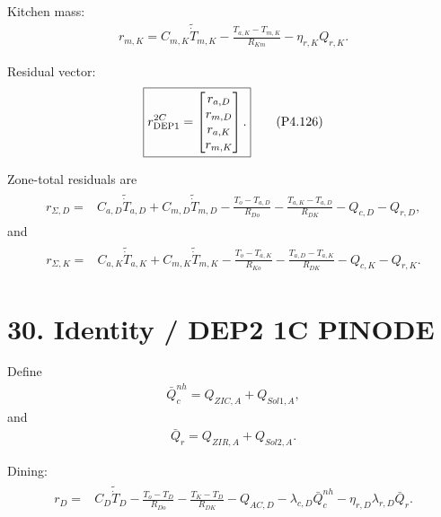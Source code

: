 \documentclass[11pt]{article}
\begin{document}
Kitchen mass:
\begin{align}
\boxed{
r_{m,K}
=
C_{m,K}\widetilde{\dot T}_{m,K}
-
\frac{T_{a,K}-T_{m,K}}{R_{Km}}
-
\eta_{r,K}Q_{r,K}.
}
\tag{P4.125}
\end{align}

Residual vector:
\begin{align}
\boxed{
r_{\rm DEP1}^{2C}
=
\begin{bmatrix}
r_{a,D}\\r_{m,D}\\r_{a,K}\\r_{m,K}
\end{bmatrix}.
}
\tag{P4.126}
\end{align}

Zone-total residuals are
\begin{align}
\boxed{
\begin{aligned}
r_{\Sigma,D}
={}&
C_{a,D}\widetilde{\dot T}_{a,D}
+
C_{m,D}\widetilde{\dot T}_{m,D}
-
\frac{T_o-T_{a,D}}{R_{Do}}
-
\frac{T_{a,K}-T_{a,D}}{R_{DK}}
-
Q_{c,D}
-
Q_{r,D},
\end{aligned}
}
\tag{P4.127}
\end{align}
and
\begin{align}
\boxed{
\begin{aligned}
r_{\Sigma,K}
={}&
C_{a,K}\widetilde{\dot T}_{a,K}
+
C_{m,K}\widetilde{\dot T}_{m,K}
-
\frac{T_o-T_{a,K}}{R_{Ko}}
-
\frac{T_{a,D}-T_{a,K}}{R_{DK}}
-
Q_{c,K}
-
Q_{r,K}.
\end{aligned}
}
\tag{P4.128}
\end{align}

\section*{30. Identity / DEP2 1C PINODE}

Define
\begin{align}
\boxed{
\bar Q_c^{nh}
=
Q_{ZIC,A}+Q_{Sol1,A},
}
\tag{P4.129}
\end{align}
and
\begin{align}
\boxed{
\bar Q_r
=
Q_{ZIR,A}+Q_{Sol2,A}.
}
\tag{P4.130}
\end{align}

Dining:
\begin{align}
\boxed{
\begin{aligned}
r_D
={}&
C_D\widetilde{\dot T}_D
-
\frac{T_o-T_D}{R_{Do}}
-
\frac{T_K-T_D}{R_{DK}}
-
Q_{AC,D}
-
\lambda_{c,D}\bar Q_c^{nh}
-
\eta_{r,D}\lambda_{r,D}\bar Q_r.
\end{aligned}
}
\tag{P4.131}
\end{align}
\end{document}
